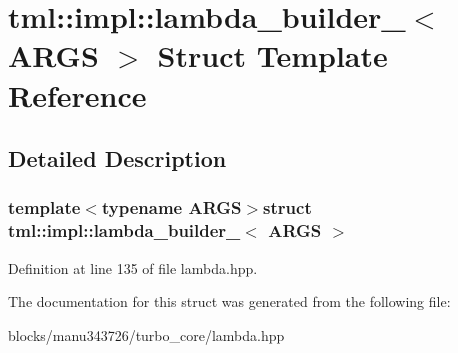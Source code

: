 \hypertarget{structtml_1_1impl_1_1lambda__builder__2}{\section{tml\+:\+:impl\+:\+:lambda\+\_\+builder\+\_$<$ A\+R\+G\+S $>$ Struct Template Reference}
\label{structtml_1_1impl_1_1lambda__builder__2}
}


\subsection{Detailed Description}
\subsubsection*{template$<$typename A\+R\+G\+S$>$struct tml\+::impl\+::lambda\+\_\+builder\+\_$<$ A\+R\+G\+S $>$}



Definition at line 135 of file lambda.\+hpp.



The documentation for this struct was generated from the following file\+:\begin{DoxyCompactItemize}
\item 
blocks/manu343726/turbo\+\_\+core/lambda.\+hpp\end{DoxyCompactItemize}
